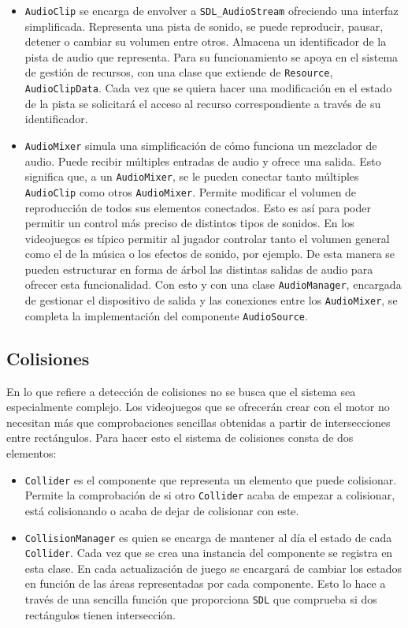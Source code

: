 \begin{itemize}
	\item \texttt{AudioClip} se encarga de envolver a \texttt{SDL\_AudioStream} ofreciendo una interfaz simplificada. Representa una pista de sonido, se puede reproducir, pausar, detener o cambiar su volumen entre otros. Almacena un identificador de la pista de audio que representa. Para su funcionamiento se apoya en el sistema de gestión de recursos, con una clase que extiende de \texttt{Resource}, \texttt{AudioClipData}. Cada vez que se quiera hacer una modificación en el estado de la pista se solicitará el acceso al recurso correspondiente a través de su identificador.
	\item \texttt{AudioMixer} simula una simplificación de cómo funciona un mezclador de audio. Puede recibir múltiples entradas de audio y ofrece una salida. Esto significa que, a un \texttt{AudioMixer}, se le pueden conectar tanto múltiples \texttt{AudioClip} como otros \texttt{AudioMixer}. Permite modificar el volumen de reproducción de todos sus elementos conectados. Esto es así para poder permitir un control más preciso de distintos tipos de sonidos. En los videojuegos es típico permitir al jugador controlar tanto el volumen general como el de la música o los efectos de sonido, por ejemplo. De esta manera se pueden estructurar en forma de árbol las distintas salidas de audio para ofrecer esta funcionalidad. Con esto y con una clase \texttt{AudioManager}, encargada de gestionar el dispositivo de salida y las conexiones entre los \texttt{AudioMixer}, se completa la implementación del componente \texttt{AudioSource}.
\end{itemize}

\subsection{Colisiones}
En lo que refiere a detección de colisiones no se busca que el sistema sea especialmente complejo. Los videojuegos que se ofrecerán crear con el motor no necesitan más que comprobaciones sencillas obtenidas a partir de intersecciones entre rectángulos. Para hacer esto el sistema de colisiones consta de dos elementos: 

\begin{itemize}
	\item \texttt{Collider} es el componente que representa un elemento que puede colisionar. Permite la comprobación de si otro \texttt{Collider} acaba de empezar a colisionar, está colisionando o acaba de dejar de colisionar con este. 
	\item \texttt{CollisionManager} es quien se encarga de mantener al día el estado de cada \texttt{Collider}. Cada vez que se crea una instancia del componente se registra en esta clase. En cada actualización de juego se encargará de cambiar los estados en función de las áreas representadas por cada componente. Esto lo hace a través de una sencilla función que proporciona \texttt{SDL} que comprueba si dos rectángulos tienen intersección.
\end{itemize}

